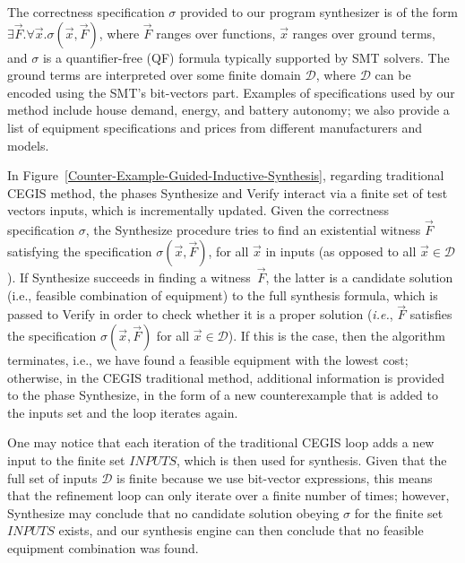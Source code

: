\documentclass[runningheads]{llncs}
\begin{document}
The correctness specification $\sigma$ provided to our program synthesizer is of the form $\exists \vec{F} . \forall \vec{x}. \sigma(\vec{x}, \vec{F})$, where $\vec{F}$ ranges over functions, $\vec{x}$ ranges over ground terms, and $\sigma$ is a quantifier-free (QF) formula typically supported by SMT solvers. The ground terms are interpreted over some finite domain $\mathcal{D}$, where $\mathcal{D}$ can be encoded using the SMT's bit-vectors part. Examples of specifications used by our method include house demand, energy, and battery autonomy; we also provide a list of equipment specifications and prices from different manufacturers and models.

In Figure~\ref{Counter-Example-Guided-Inductive-Synthesis}, regarding traditional CEGIS method, the phases {\sc Synthesize} and {\sc Verify} interact via a finite set of test vectors {\sc inputs}, which is incrementally updated. Given the correctness specification $\sigma$, the {\sc Synthesize} procedure tries to find an existential witness $\vec{F}$ satisfying the specification $\sigma(\vec{x}, \vec{F})$, for all $\vec{x}$ in {\sc inputs} (as opposed to all $\vec{x} \in \mathcal{D}$). If {\sc Synthesize} succeeds in finding a witness~$\vec{F}$, the latter is a candidate solution (i.e., feasible combination of equipment) to the full synthesis formula, which is passed to {\sc Verify} in order to check whether it is a proper solution ({\it i.e.}, $\vec{F}$ satisfies the specification $\sigma(\vec{x}, \vec{F})$ for all $\vec{x}\in\mathcal{D}$). If this is the case, then the algorithm terminates, i.e., we have found a feasible equipment with the lowest cost; otherwise, in the CEGIS traditional method, additional information is provided to the phase {\sc Synthesize}, in the form of a new counterexample that is added to the {\sc inputs} set and the loop iterates again.

One may notice that each iteration of the traditional CEGIS loop adds a new input to the finite set $INPUTS$, which is then used for synthesis. Given that the full set of inputs $\mathcal{D}$ is finite because we use bit-vector expressions, this means that the refinement loop can only iterate over a finite number of times; however, {\sc Synthesize} may conclude that no candidate solution obeying $\sigma$ for the finite set $INPUTS$ exists, and our synthesis engine can then conclude that no feasible equipment combination was found.
\end{document}
